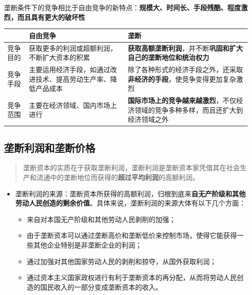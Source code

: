 \documentclass[
]{article}
\begin{document}
垄断条件下的竞争相比于自由竞争的新特点：\textbf{规模大、时间长、手段残酷、程度激烈，而且具有更大的破坏性}

\begin{longtable}[]{@{}lll@{}}
\toprule\noalign{}
& 自由竞争 & 垄断 \\
\midrule\noalign{}
\endhead
\bottomrule\noalign{}
\endlastfoot
竞争目的 & 获取更多的利润或超额利润，不断扩大资本的积累 &
\textbf{获取高额垄断利润}，并不断\textbf{巩固和扩大自己的垄断地位和统治权力} \\
竞争手段 &
主要运用经济手段，如通过改进技术、提高劳动生产率、降低产品成本 &
除了各种形式的经济手段之外，还采取\textbf{非经济的手段}，使竞争变得更加复杂激烈 \\
竞争范围 & 主要在经济领域、国内市场上进行 &
\textbf{国际市场上的竞争越来越激烈}，不仅经济领域的竞争多种多样，而且还扩大到经济领域之外 \\
\end{longtable}

\hypertarget{ux5784ux65adux5229ux6da6ux548cux5784ux65adux4ef7ux683c}{%
\subsection{垄断利润和垄断价格}\label{ux5784ux65adux5229ux6da6ux548cux5784ux65adux4ef7ux683c}}

\begin{quote}
垄断资本的实质在于获取垄断利润，垄断利润是垄断资本家凭借其在社会生产和流通中的垄断地位而获得的\textbf{超过平均利润}的高额利润。
\end{quote}

\begin{itemize}
\item
  垄断利润的来源：垄断资本所获得的高额利润，归根到底来\textbf{自无产阶级和其他劳动人民创造的剩余价值}。具体来说，垄断利润的来源大体有以下几个方面：

  \begin{itemize}
  \item
    来自对本国无产阶级和其他劳动人民剥削的加强；
  \item
    由于垄断资本可以通过垄断高价和垄断低价来控制市场，使得它能获得一些其他企业特别是非垄断企业的利润；
  \item
    通过加强对其他国家劳动人民的剥削和掠夺，从国外获取利润；
  \item
    通过资本主义国家政权进行有利于垄断资本的再分配，从而将劳动人民创造的国民收入的一部分变成垄断资本的收入。
  \end{itemize}
\end{itemize}
\end{document}
